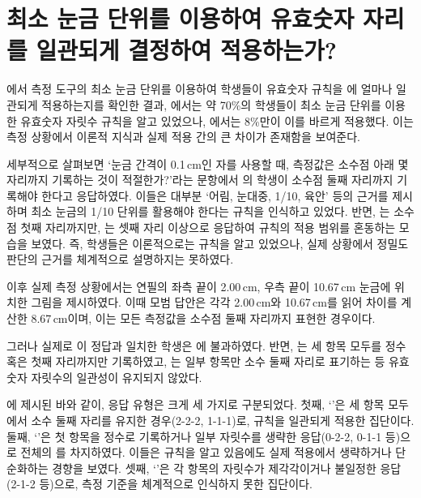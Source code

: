 \section{최소 눈금 단위를 이용하여 유효숫자 자리를 일관되게 결정하여 적용하는가?}

에서
측정 도구의 최소 눈금 단위를 이용하여 학생들이
유효숫자 규칙을 에 얼마나 일관되게 적용하는지를 확인한 결과,
%
에서는 약 70\%의 학생들이 최소 눈금 단위를 이용한 유효숫자 자릿수 규칙을 알고 있었으나,
%
에서는
8\%만이 이를 바르게 적용했다.
%
이는 측정 상황에서 이론적 지식과 실제 적용 간의 큰 차이가 존재함을 보여준다.

세부적으로 살펴보면 `눈금 간격이 0.1\,cm인 자를 사용할 때,
측정값은 소수점 아래 몇 자리까지 기록하는 것이 적절한가?'라는 문항에서
의 학생이 소수점 둘째 자리까지 기록해야 한다고 응답하였다.
이들은 대부분 `어림, 눈대중, 1/10, 육안' 등의 근거를 제시하며 최소 눈금의 1/10 단위를 활용해야 한다는
규칙을 인식하고 있었다. 반면, 는 소수점 첫째 자리까지만,
는 셋째 자리 이상으로 응답하여
규칙의 적용 범위를 혼동하는 모습을 보였다. 즉, 학생들은 이론적으로는 규칙을 알고 있었으나,
실제 상황에서 정밀도 판단의 근거를 체계적으로 설명하지는 못하였다.

\DigitChoiceWithScaleInfo

이후 실제 측정 상황에서는 연필의 좌측 끝이 2.00\,cm, 우측 끝이 10.67\,cm 눈금에
위치한 그림을 제시하였다.
%
이때 모범 답안은 각각 2.00\,cm와 10.67\,cm를 읽어 차이를 계산한 8.67\,cm이며,
이는 모든 측정값을 소수점 둘째 자리까지 표현한 경우이다.


그러나 실제로 이 정답과 일치한 학생은 에 불과하였다.
반면, 는 세 항목 모두를 정수 혹은 첫째 자리까지만 기록하였고,
는 일부 항목만 소수 둘째 자리로 표기하는 등
유효숫자 자릿수의 일관성이 유지되지 않았다.

\ActualMeasurementType

에 제시된 바와 같이,
응답 유형은 크게 세 가지로 구분되었다.
%
첫째, `'은 세 항목 모두에서 소수 둘째 자리를 유지한
경우(2-2-2, 1-1-1)로, 규칙을 일관되게 적용한 집단이다.
%
둘째, `'은 첫 항목을 정수로 기록하거나 일부 자릿수를
생략한 응답(0-2-2, 0-1-1 등)으로 전체의 를 차지하였다.
이들은 규칙을 알고 있음에도 실제 적용에서 생략하거나 단순화하는 경향을 보였다.
%
셋째, `'은 각 항목의 자릿수가 제각각이거나 불일정한
응답(2-1-2 등)으로, 측정 기준을 체계적으로 인식하지 못한 집단이다.


